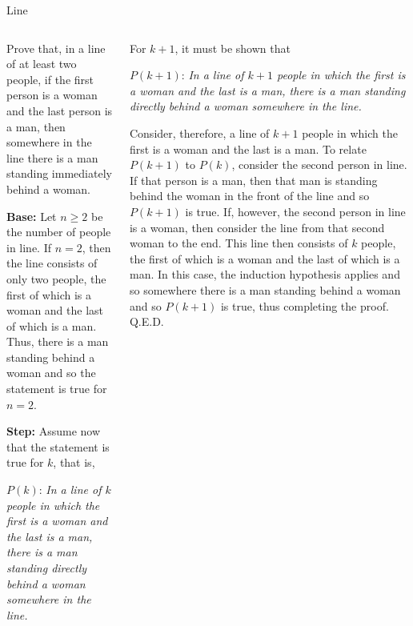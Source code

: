 \documentclass[9pt,aspectratio=169]{beamer}
\begin{document}
\begin{frame}{Line}
  \begin{columns}[T]
    \begin{column}{0.5\textwidth}
      \begin{problem}
        Prove that, in a line of at least two people, if the first person is a woman and the last person is a man, then somewhere in the line there is a man standing immediately behind a woman.
      \end{problem}\pause

      \textbf{Base:} Let $n \geq 2$ be the number of people in line. If $n = 2$, then the line consists of only two people, the first of which is a woman and the last of which is a man. Thus, there is a man standing behind a woman and so the statement is true for $n = 2$.\pause

      \textbf{Step:} Assume now that the statement is true for $k$, that is, \smallskip

      $P(k)$: \emph{In a line of $k$ people in which the first is a woman and the last is a man, there is a man standing directly behind a woman somewhere in the line.}\pause
    \end{column}
    \begin{column}{0.5\textwidth}

      For $k + 1$, it must be shown that
      \smallskip

      $P(k+1)$: \emph{In a line of $k + 1$ people in which the first is a woman and the last is a man, there is a man standing directly behind a woman somewhere in the line.}
      \smallskip\pause

      Consider, therefore, a line of $k + 1$ people in which the first is a woman and the last is a man. To relate $P(k + 1)$ to $P(k)$, consider the second person in line. If that person is a man, then that man is standing behind the woman in the front of the line and so $P(k + 1)$ is true. If, however, the second person in line is a woman, then consider the line from that second woman to the end. This line then consists of $k$ people, the first of which is a woman and the last of which is a man. In this case, the induction hypothesis applies and so somewhere there is a man standing behind a woman and so $P(k + 1)$ is true, thus completing the proof. \hfill Q.E.D.
    \end{column}
  \end{columns}
\end{frame}
\end{document}
